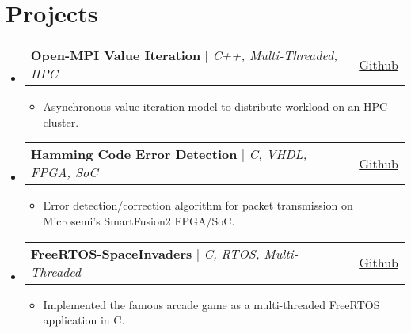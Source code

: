 \documentclass[letterpaper,11pt]{article}
\makeatletter
\newcommand{\resumeItem}[1]{
  \item\small{
    {#1 \vspace{-2pt}}
  }
}
\newcommand{\resumeProjectHeading}[2]{
    \item
    \begin{tabular*}{0.97\textwidth}{l@{\extracolsep{\fill}}r}
      \small#1 & #2 \\
    \end{tabular*}\vspace{-7pt}
}
\newcommand{\resumeSubHeadingListStart}{\begin{itemize}[leftmargin=0.15in, label={}]}
\newcommand{\resumeSubHeadingListEnd}{\end{itemize}}
\newcommand{\resumeItemListStart}{\begin{itemize}}
\newcommand{\resumeItemListEnd}{\end{itemize}\vspace{-5pt}}
\makeatother
\begin{document}
\section{Projects}
    \resumeSubHeadingListStart
        \resumeProjectHeading
            {\textbf{Open-MPI Value Iteration} $|$ \emph{C++, Multi-Threaded, HPC}}{\href{https://github.com/duclos-cavalcanti/Open-MPI-ValueIteration}{\underline{Github}}}
            \resumeItemListStart
              \resumeItem{Asynchronous value iteration model to distribute workload on an HPC cluster.}
            \resumeItemListEnd
        \resumeProjectHeading
            {\textbf{Hamming Code Error Detection} $|$ \emph{C, VHDL, FPGA, SoC}}{\href{https://github.com/duclos-cavalcanti/microsemi-error-detection}{\underline{Github}}}
            \resumeItemListStart
              \resumeItem{Error detection/correction algorithm for packet transmission on Microsemi's SmartFusion2 FPGA/SoC.}
            \resumeItemListEnd
        \resumeProjectHeading
            {\textbf{FreeRTOS-SpaceInvaders} $|$ \emph{C, RTOS, Multi-Threaded}}{\href{https://github.com/duclos-cavalcanti/FreeRTOS-SpaceInvaders}{\underline{Github}}}
            \resumeItemListStart
              \resumeItem{Implemented the famous arcade game as a multi-threaded FreeRTOS application in C.}
            \resumeItemListEnd

    \resumeSubHeadingListEnd
    
\end{document}
